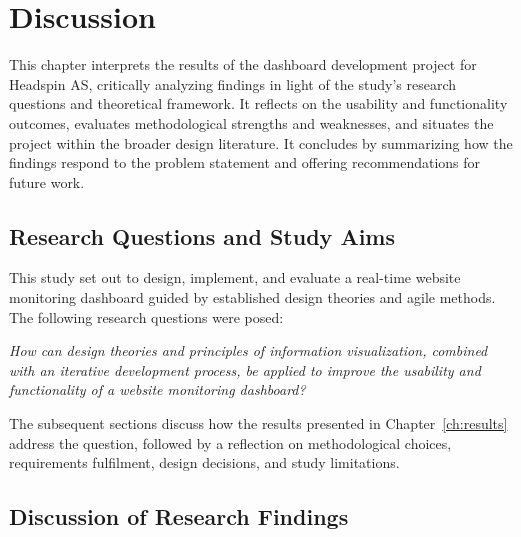 \chapter{Discussion}
\label{ch:discussion}


This chapter interprets the results of the dashboard development project for Headspin AS, critically analyzing findings in light of the study’s research questions and theoretical framework. It reflects on the usability and functionality outcomes, evaluates methodological strengths and weaknesses, and situates the project within the broader design literature. It concludes by summarizing how the findings respond to the problem statement and offering recommendations for future work.

\section{Research Questions and Study Aims}
\label{sec:discussion_intro}

This study set out to design, implement, and evaluate a real-time website monitoring dashboard guided by established design theories and agile methods. The following research questions were posed:

\begin{mainbox}
      \textit{How can design theories and principles of information visualization, combined with an iterative development process, be applied to improve the usability and functionality of a website monitoring dashboard? }
\end{mainbox}

The subsequent sections discuss how the results presented in Chapter~\ref{ch:results} address the question, followed by a reflection on methodological choices, requirements fulfilment, design decisions, and study limitations.

\section{Discussion of Research Findings}
\label{sec:discussion_findings}

